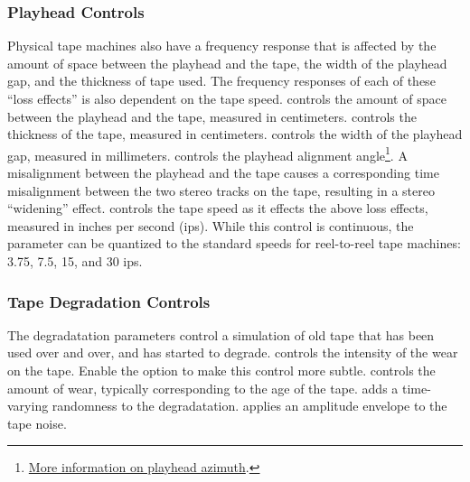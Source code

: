 \documentclass[landscape,twocolumn,a5paper]{manual}
\begin{document}
\subsubsection{Playhead Controls}
Physical tape machines also have a frequency response that
is affected by the amount of space between the playhead and
the tape, the width of the playhead gap, and the thickness
of tape used. The frequency responses of each of these ``loss
effects'' is also dependent on the tape speed.
\newpar
{}
controls the amount of space between the playhead and the tape,
measured in centimeters.
\newpar
{} controls the thickness
of the tape, measured in centimeters.
\newpar
{} controls
the width of the playhead gap, measured in millimeters.
\newpar
{}
controls the playhead alignment angle\footnote{\href{https://blog.weareavp.com/azimuth-adjustment-for-magnetic-audio-recordings}{More information on playhead azimuth}.}.
A misalignment between the playhead and the tape causes a
corresponding time misalignment between the two stereo tracks
on the tape, resulting in a stereo ``widening'' effect.
\newpar
{}
controls the tape speed as it effects the above loss effects,
measured in inches per second (ips). While this control is
continuous, the parameter can be quantized to the standard speeds
for reel-to-reel tape machines: 3.75, 7.5, 15, and 30 ips.
\newline
\newline
\newline
\subsubsection{Tape Degradation Controls}
The degradatation parameters control a simulation of
old tape that has been used over and over, and has started
to degrade.
\newline
{}
controls the intensity of the wear on the tape. Enable the
 option to make this control more subtle.
\newpar
{}
controls the amount of wear, typically corresponding to
the age of the tape.
\newpar
{}
adds a time-varying randomness to the degradatation.
\newpar
{}
applies an amplitude envelope to the tape noise.
\end{document}
